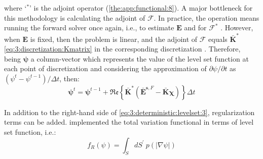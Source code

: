 			\noindent where `$^*$' is the adjoint operator (\ref{the:app:functional:8}). A major bottleneck for this methodology is calculating the adjoint of $\mathcal{F}$. In practice, the operation means running the forward solver once again, i.e., to estimate $\mathbf{E}$ and for $\mathcal{F}^*$ \citep{shenawee2009adjoint,woten2010experimental}. However, when $\mathbf{E}$ is fixed, then the problem is linear, and the adjoint of $\mathcal{F}$ equals $\mathbf{\bar{K}^*}$ \eqref{eq:3:discretization:Kmatrix} in the corresponding discretization \citep{shah2015fast,colgan20153d}. Therefore, being $\boldsymbol{\psi}$ a column-vector which represents the value of the level set function at each point of discretization and considering the approximation of $\partial\psi/\partial t$ as $(\psi^t-\psi^{t-1})/\Delta t$, then:
			\begin{equation}
				\boldsymbol{\psi}^t = \boldsymbol{\psi}^{t-1} + \mathfrak{Re}\left\{\mathbf{\bar{K}}^*\left(\mathbf{\bar{E}}^{\mathbf{s},F}-\mathbf{\bar{K}}\boldsymbol{\chi}\right)\right\}\Delta t \label{eq:3:deterministic:levelset:3}
			\end{equation}
		
			In addition to the right-hand side of \eqref{eq:3:deterministic:levelset:3}, regularization terms can be added. \cite{shah2018fast} implemented the total variation functional in terms of level set function, i.e.:
			\begin{equation}
				f_R(\psi) = \int_S dS^\prime~ p(|\nabla\psi|) \label{eq:3:deterministic:levelset:4}
			\end{equation}
		
